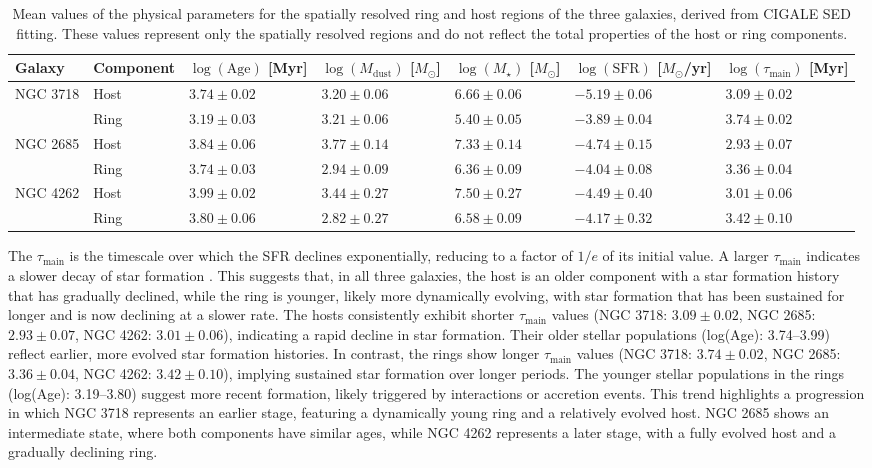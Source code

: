 \documentclass{pas}
\begin{document}
\begin{table}
\centering
\caption{Mean values of the physical parameters for the spatially resolved ring and host regions of the three galaxies, derived from CIGALE SED fitting. These values represent only the spatially resolved regions and do not reflect the total properties of the host or ring components.}
\begin{tabular}{|l|l|l|l|l|l|l|}
\hline
Galaxy    & Component & $\log(\text{Age})$ [Myr] & $\log(M_\text{dust})$ [$M_\odot$] & $\log(M_\star)$ [$M_\odot$] & $\log(\text{SFR})$ [$M_\odot$/yr] & $\log(\tau_\text{main})$ [Myr] \\ \hline
NGC 3718  & Host      & $3.74 \pm 0.02$ & $3.20 \pm 0.06$ & $6.66 \pm 0.06$ & $-5.19 \pm 0.06$ & $3.09 \pm 0.02$ \\ 
          & Ring      & $3.19 \pm 0.03$ & $3.21 \pm 0.06$ & $5.40 \pm 0.05$ & $-3.89 \pm 0.04$ & $3.74 \pm 0.02$ \\ \hline
NGC 2685  & Host      & $3.84 \pm 0.06$ & $3.77 \pm 0.14$ & $7.33 \pm 0.14$ & $-4.74 \pm 0.15$ & $2.93 \pm 0.07$ \\ 
          & Ring      & $3.74 \pm 0.03$ & $2.94 \pm 0.09$ & $6.36 \pm 0.09$ & $-4.04 \pm 0.08$ & $3.36 \pm 0.04$ \\ \hline
NGC 4262  & Host      & $3.99 \pm 0.02$ & $3.44 \pm 0.27$ & $7.50 \pm 0.27$ & $-4.49 \pm 0.40$ & $3.01 \pm 0.06$ \\ 
          & Ring      & $3.80 \pm 0.06$ & $2.82 \pm 0.27$ & $6.58 \pm 0.09$ & $-4.17 \pm 0.32$ & $3.42 \pm 0.10$ \\ \hline
\end{tabular}
\label{tab:cig_out}
\end{table}


{The \(\tau_{\text{main}}\) is the timescale over which the SFR declines exponentially, reducing to a factor of \(1/e\) of its initial value. A larger \(\tau_{\text{main}}\) indicates a slower decay of star formation \citep{2019Boquien}. This suggests that, in all three galaxies, the host is an older component with a star formation history that has gradually declined, while the ring is younger, likely more dynamically evolving, with star formation that has been sustained for longer and is now declining at a slower rate.}
The hosts consistently exhibit shorter \(\tau_{\text{main}}\) values (NGC 3718: \(3.09 \pm 0.02\), NGC 2685: \(2.93 \pm 0.07\), NGC 4262: \(3.01 \pm 0.06\)), indicating a rapid decline in star formation. Their older stellar populations (log(Age): 3.74–3.99) reflect earlier, more evolved star formation histories. In contrast, the rings show longer \(\tau_{\text{main}}\) values (NGC 3718: \(3.74 \pm 0.02\), NGC 2685: \(3.36 \pm 0.04\), NGC 4262: \(3.42 \pm 0.10\)), implying sustained star formation over longer periods. The younger stellar populations in the rings (log(Age): 3.19–3.80) suggest more recent formation, likely triggered by interactions or accretion events. This trend highlights a progression in which NGC 3718 represents an earlier stage, featuring a dynamically young ring and a relatively evolved host. NGC 2685 shows an intermediate state, where both components have similar ages, while NGC 4262 represents a later stage, with a fully evolved host and a gradually declining ring.
\end{document}
